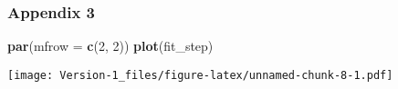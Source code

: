 \documentclass[]{article}
\newenvironment{Shaded}{\begin{snugshade}}{\end{snugshade}}
\newcommand{\KeywordTok}[1]{\textcolor[rgb]{0.13,0.29,0.53}{\textbf{#1}}}
\newcommand{\DataTypeTok}[1]{\textcolor[rgb]{0.13,0.29,0.53}{#1}}
\newcommand{\DecValTok}[1]{\textcolor[rgb]{0.00,0.00,0.81}{#1}}
\newcommand{\NormalTok}[1]{#1}
\begin{document}
\subsubsection{Appendix 3}\label{appendix-3}

\begin{Shaded}
\begin{Highlighting}[]
\KeywordTok{par}\NormalTok{(}\DataTypeTok{mfrow =} \KeywordTok{c}\NormalTok{(}\DecValTok{2}\NormalTok{, }\DecValTok{2}\NormalTok{))}
\KeywordTok{plot}\NormalTok{(fit_step)}
\end{Highlighting}
\end{Shaded}

\texttt{[image: Version-1\_files/figure-latex/unnamed-chunk-8-1.pdf]}
\end{document}
